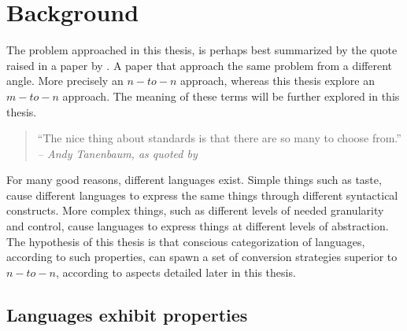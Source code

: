 \documentclass{scrreprt}
\begin{document}
%
%
%
%
%
%


\tableofcontents
\pagebreak











%
%
%
%
%
%










%
%
%
%
%
%

\chapter{Background}
The problem approached in this thesis, is perhaps best summarized by the quote raised in a paper by \citet{krijnen}. A paper that approach the same problem from a different angle. More precisely an $n-to-n$ approach, whereas this thesis explore an $m-to-n$ approach. The meaning of these terms will be further explored in this thesis.

\begin{quote}
``The nice thing about standards is that there are so many to choose from.''\\
\textit{-- Andy Tanenbaum, as quoted by \citet{krijnen}}
\end{quote}

For many good reasons, different languages exist. Simple things such as taste, cause different languages to express the same things through different syntactical constructs. More complex things, such as different levels of needed granularity and control, cause languages to express things at different levels of abstraction. The hypothesis of this thesis is that conscious categorization of languages, according to such properties, can spawn a set of conversion strategies superior to $n-to-n$, according to aspects detailed later in this thesis.

\section{Languages exhibit properties}
\end{document}
